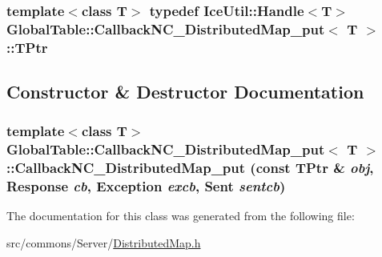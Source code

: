 \label{class_global_table_1_1_callback_n_c___distributed_map__put_a166741a62eb027de0db09fd0a8fd505d}
\hypertarget{class_global_table_1_1_callback_n_c___distributed_map__put_aac571ffa85d8997eaeb5d30bf47e1f73}{
\subsubsection[{TPtr}]{\setlength{\rightskip}{0pt plus 5cm}template$<$class T$>$ typedef IceUtil::Handle$<$T$>$ {\bf GlobalTable::CallbackNC\_\-DistributedMap\_\-put}$<$ T $>$::{\bf TPtr}}}
\label{class_global_table_1_1_callback_n_c___distributed_map__put_aac571ffa85d8997eaeb5d30bf47e1f73}


\subsection{Constructor \& Destructor Documentation}
\hypertarget{class_global_table_1_1_callback_n_c___distributed_map__put_ab670ca51d46ab25d3e2dc1085a6283a4}{
\subsubsection[{CallbackNC\_\-DistributedMap\_\-put}]{\setlength{\rightskip}{0pt plus 5cm}template$<$class T$>$ {\bf GlobalTable::CallbackNC\_\-DistributedMap\_\-put}$<$ T $>$::{\bf CallbackNC\_\-DistributedMap\_\-put} (const {\bf TPtr} \& {\em obj}, \/  {\bf Response} {\em cb}, \/  {\bf Exception} {\em excb}, \/  {\bf Sent} {\em sentcb})}}
\label{class_global_table_1_1_callback_n_c___distributed_map__put_ab670ca51d46ab25d3e2dc1085a6283a4}


The documentation for this class was generated from the following file:\begin{DoxyCompactItemize}
\item 
src/commons/Server/\hyperlink{_distributed_map_8h}{DistributedMap.h}\end{DoxyCompactItemize}

